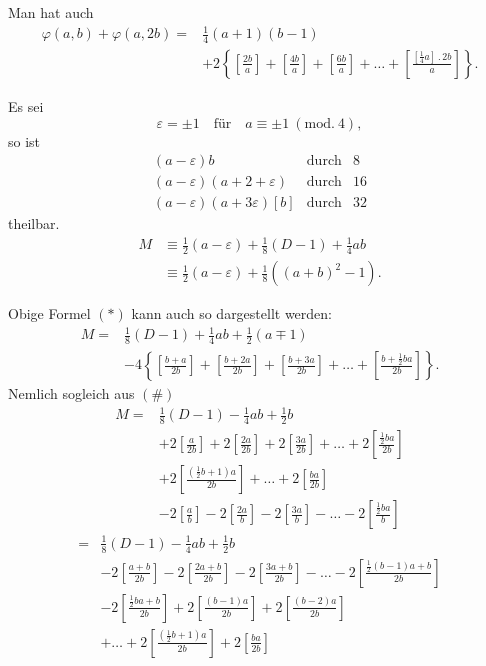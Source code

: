 \par\indent Man hat auch
\[
\begin{aligned}
\varphi(a,b)+\varphi(a,2b)={}&\tfrac14(a+1)(b-1)\\
&+2\left\{\left[\frac{2b}a\right]+\left[\frac{4b}a\right]+\left[\frac{6b}a\right]+\ldots+\left[\frac{[\tfrac14a]\mathpunct{.}2b}a\right]\right\}.
\end{aligned}
\]
\par\noindent\hspace*{\parindent}Es sei
\[
\varepsilon=\pm1\quad\text{für}\quad a\equiv\pm1\ (\mathrm{mod.}\ 4),
\]
\noindent so ist
\[
\begin{array}{rlr}
(a-\varepsilon)b&\text{durch}&8\\
(a-\varepsilon)(a+2+\varepsilon)&\text{durch}&16\\
(a-\varepsilon)(a+3\varepsilon)[b]&\text{durch}&32
\end{array}
\]
\noindent theilbar.
\[
\begin{aligned}
M&\equiv\tfrac12(a-\varepsilon)+\tfrac18(D-1)+\tfrac14ab\\
&\equiv\tfrac12(a-\varepsilon)+\tfrac18((a+b)^2-1).
\end{aligned}
\]
\par\indent Obige Formel $(\ast)$ kann auch so dargestellt werden:
\[
\begin{aligned}
M={}&\tfrac18(D-1)+\tfrac14ab+\tfrac12(a\mp1)\\
&-4\left\{\left[\frac{b+a}{2b}\right]+\left[\frac{b+2a}{2b}\right]+\left[\frac{b+3a}{2b}\right]+\ldots+\left[\frac{b+\tfrac12ba}{2b}\right]\right\}.
\end{aligned}
\]
\noindent Nemlich sogleich aus $(\#)$
\[
\begin{aligned}
M={}&\tfrac18(D-1)-\tfrac14ab+\tfrac12b\\
&+2\left[\frac a{2b}\right]+2\left[\frac{2a}{2b}\right]+2\left[\frac{3a}{2b}\right]+\ldots+2\left[\frac{\tfrac12ba}{2b}\right]\\
&+2\left[\frac{(\tfrac12b+1)a}{2b}\right]+\ldots+2\left[\frac{ba}{2b}\right]\\
&-2\left[\frac ab\right]-2\left[\frac{2a}b\right]-2\left[\frac{3a}b\right]-\ldots-2\left[\frac{\tfrac12ba}b\right]
\end{aligned}
\]
\[
\begin{aligned}
{}={}&\tfrac18(D-1)-\tfrac14ab+\tfrac12b\\
&-2\left[\frac{a+b}{2b}\right]-2\left[\frac{2a+b}{2b}\right]-2\left[\frac{3a+b}{2b}\right]-\ldots-2\left[\frac{\tfrac12(b-1)a+b}{2b}\right]\\
&-2\left[\frac{\tfrac12ba+b}{2b}\right]+2\left[\frac{(b-1)a}{2b}\right]+2\left[\frac{(b-2)a}{2b}\right]\\
&+\ldots+2\left[\frac{(\tfrac12b+1)a}{2b}\right]+2\left[\frac{ba}{2b}\right]
\end{aligned}
\]
